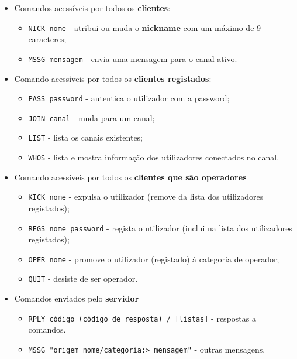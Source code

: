 \documentclass[11pt]{article}   %
\begin{document}
\begin{itemize}
    \item Comandos acessíveis por todos os \textbf{clientes}:
    \begin{itemize}
        \item \verb|NICK nome| - atribui ou muda o \textbf{nickname} com um máximo de 9 caracteres;
        \item \verb|MSSG mensagem| - envia uma mensagem para o canal ativo.
    \end{itemize}
    \item Comando acessíveis por todos os \textbf{clientes registados}:
        \begin{itemize}
            \item \verb|PASS password| - autentica o utilizador com a password;
            \item \verb|JOIN canal| - muda para um canal;
            \item \verb|LIST| - lista os canais existentes;
            \item \verb|WHOS| - lista e mostra informação dos utilizadores conectados no canal.
        \end{itemize}
    \item Comando acessíveis por todos os \textbf{clientes que são operadores}
        \begin{itemize}
            \item \verb|KICK nome| - expulsa o utilizador (remove da lista dos utilizadores registados);
            \item \verb|REGS nome password| - regista o utilizador (inclui na lista dos utilizadores registados);
            \item \verb|OPER nome| - promove o utilizador (registado) à categoria de operador;
            \item \verb|QUIT| - desiste de ser operador.
        \end{itemize}
    \item Comandos enviados pelo \textbf{servidor}
        \begin{itemize}
            \item \verb|RPLY código (código de resposta) / [listas]| - respostas a comandos.
            \item \verb|MSSG "origem nome/categoria:> mensagem"| - outras mensagens.
        \end{itemize}
\end{itemize}

\end{document}
